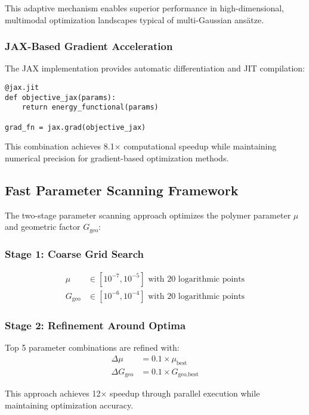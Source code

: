 \documentclass[12pt,a4paper]{article}
\begin{document}
This adaptive mechanism enables superior performance in high-dimensional, multimodal optimization landscapes typical of multi-Gaussian ansätze.

\subsubsection{JAX-Based Gradient Acceleration}

The JAX implementation provides automatic differentiation and JIT compilation:

\begin{verbatim}
@jax.jit
def objective_jax(params):
    return energy_functional(params)

grad_fn = jax.grad(objective_jax)
\end{verbatim}

This combination achieves 8.1× computational speedup while maintaining numerical precision for gradient-based optimization methods.

\subsection{Fast Parameter Scanning Framework}

The two-stage parameter scanning approach optimizes the polymer parameter $\mu$ and geometric factor $G_{\text{geo}}$:

\subsubsection{Stage 1: Coarse Grid Search}
\begin{align}
\mu &\in [10^{-7}, 10^{-5}] \text{ with } 20 \text{ logarithmic points} \\
G_{\text{geo}} &\in [10^{-6}, 10^{-4}] \text{ with } 20 \text{ logarithmic points}
\end{align}

\subsubsection{Stage 2: Refinement Around Optima}
Top 5 parameter combinations are refined with:
\begin{align}
\Delta\mu &= 0.1 \times \mu_{\text{best}} \\
\Delta G_{\text{geo}} &= 0.1 \times G_{\text{geo,best}}
\end{align}

This approach achieves 12× speedup through parallel execution while maintaining optimization accuracy.
\end{document}
